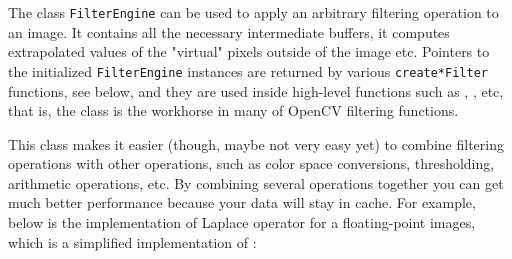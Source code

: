 The class \texttt{FilterEngine} can be used to apply an arbitrary filtering operation to an image.
It contains all the necessary intermediate buffers, it computes extrapolated values
of the "virtual" pixels outside of the image etc. Pointers to the initialized \texttt{FilterEngine} instances
are returned by various \texttt{create*Filter} functions, see below, and they are used inside high-level functions such as , ,  etc, that is, the class is the workhorse in many of OpenCV filtering functions.

This class makes it easier (though, maybe not very easy yet) to combine filtering operations with other operations, such as color space conversions, thresholding, arithmetic operations, etc. By combining several operations together you can get much better performance because your data will stay in cache. For example, below is the implementation of Laplace operator for a floating-point images, which is a simplified implementation of :

